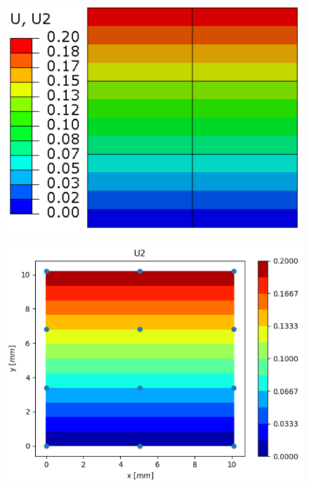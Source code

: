 \documentclass[11pt]{article}
\begin{document}
\begin{figure}[H]
	\centering
	\begin{minipage}{.5\textwidth}
		\centering
		\includegraphics[width=1\linewidth]{EM23U2.png}
		\label{EM23U2}
	\end{minipage}%
	\begin{minipage}{.5\textwidth}
		\centering
		\includegraphics[width=1\linewidth]{EM23U2_IGA.png}
		\label{EM23U2_IGA}
	\end{minipage}
\end{figure}
\end{document}
